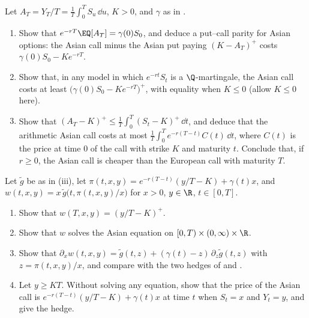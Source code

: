 \begin{exercise}\label{ex:exo-asian-bounds}
\easy Let $A_T=Y_T/T=\frac1T\int_0^TS_u\,\dd u$, $K>0$, and $\gamma$ as in .
\begin{enumerate}[label=(\alph*)]
  \item Show that $e^{-rT}\EQ[A_T]=\gamma(0)S_0$, and deduce a put--call parity for Asian options:
    the Asian call minus the Asian put paying $(K-A_T)^+$ costs $\gamma(0)S_0-Ke^{-rT}$.
  \item Show that, in any model in which $e^{-rt}S_t$ is a $\Q$-martingale, the Asian call costs at
    least $\big(\gamma(0)S_0-Ke^{-rT}\big)^+$, with equality when $K\le0$ (allow $K\le0$ here).
  \item Show that $(A_T-K)^+\le\frac1T\int_0^T(S_t-K)^+\,\dd t$, and deduce that the arithmetic Asian
    call costs at most $\frac1T\int_0^Te^{-r(T-t)}C(t)\,\dd t$, where $C(t)$ is the price at time $0$ of
    the call with strike $K$ and maturity $t$. Conclude that, if $r\ge0$, the Asian call is cheaper
    than the European call with maturity $T$.
\end{enumerate}
\end{exercise}

\begin{exercise}\label{ex:exo-vecer-2d}
\medium Let $\tilde g$ be as in (iii), let
$\pi(t,x,y)=e^{-r(T-t)}(y/T-K)+\gamma(t)x$, and $w(t,x,y)=x\,\tilde g\big(t,\pi(t,x,y)/x\big)$ for
$x>0$, $y\in\R$, $t\in[0,T]$.
\begin{enumerate}[label=(\alph*)]
  \item Show that $w(T,x,y)=(y/T-K)^+$.
  \item Show that $w$ solves the Asian equation  on $[0,T)\times(0,\infty)\times\R$.
  \item Show that $\partial_xw(t,x,y)=\tilde g(t,z)+(\gamma(t)-z)\,\partial_z\tilde g(t,z)$ with
    $z=\pi(t,x,y)/x$, and compare with the two hedges of  and
    .
  \item Let $y\ge KT$. Without solving any equation, show that the price of the Asian call is
    $e^{-r(T-t)}(y/T-K)+\gamma(t)x$ at time $t$ when $S_t=x$ and $Y_t=y$, and give the hedge.
\end{enumerate}
\end{exercise}


